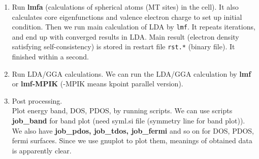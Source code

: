 \documentclass[a4paper,10pt,epsf,fleqn]{article}
\newcommand{\exe}[1]{{\bf #1}}
\newcommand{\io}[1]{{\sf  #1}}
\begin{document}
\begin{enumerate}
\item Run \exe{lmfa} (calculations of spherical atoms (MT sites) in the cell). 
       It also calculates core eigenfunctions and valence electron charge
      to set up initial condition. Then we run main calculation of LDA by \verb+lmf+.
      It repeats iterations, and end up with converged results in LDA. Main result
      (electron density satisfying self-consistency) is stored in
      restart file \verb+rst.*+ (binary file).
      It finished within a second.

\item Run LDA/GGA calculations. 
      We can run the LDA/GGA calculation by \exe{lmf} or \exe{lmf-MPIK}
      (-MPIK means kpoint parallel version).

\item Post processing.\\
      Plot energy band, DOS, PDOS, by running scripts.
      We can use scripts \exe{job\_band} for 
      band plot (need \io{syml.si} file (symmetry line for band plot)).
      We also have \exe{job\_pdos, job\_tdos, job\_fermi} and so on for
      DOS, PDOS, fermi surfaces. 
      Since we use gnuplot to plot them, meanings of obtained data is
      apparently clear.

\end{enumerate}
\end{document}
